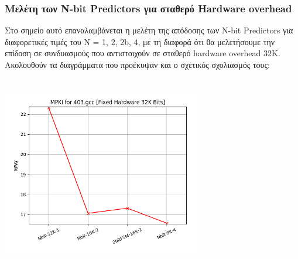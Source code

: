 \newpage
\vspace{3mm}

\subsubsection{Μελέτη των N-bit Predictors για σταθερό Hardware overhead}
Στο σημείο αυτό επαναλαμβάνεται η μελέτη της απόδοσης των N-bit Predictors για
διαφορετικές τιμές του N = 1, 2, 2b, 4, με τη διαφορά ότι θα μελετήσουμε την
επίδοση σε συνδυασμούς που αντιστοιχούν σε σταθερό hardware overhead 32Κ. \\

\noindent Ακολουθούν τα διαγράμματα που προέκυψαν και ο σχετικός σχολιασμός
τους:
\vspace{1em}

   \begin{minipage}{\textwidth}
      \begin{center}
         \\
         \vspace{3mm}
         \includegraphics[width=0.65\textwidth, frame]{./graphs/4-2ii/403-gcc.png}
         \vspace{6mm}
      \end{center}
   \end{minipage}

